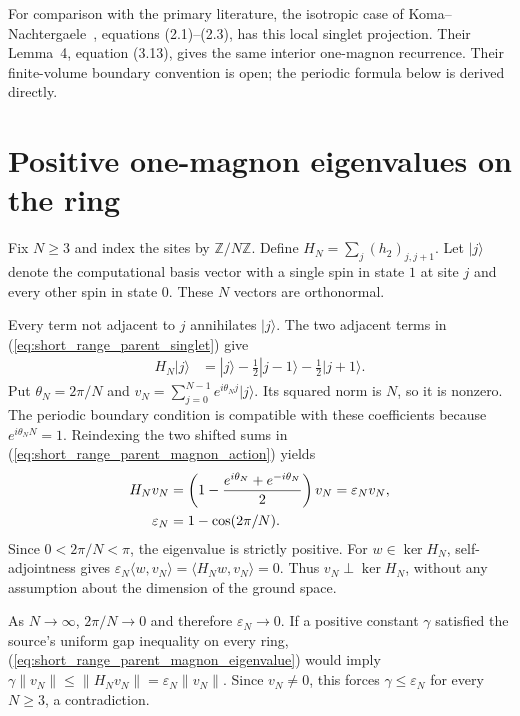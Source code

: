 \documentclass{article}
\begin{document}
For comparison with the primary literature, the isotropic case of
Koma--Nachtergaele~\cite{Koma1997Spectral}, equations (2.1)--(2.3), has this local
singlet projection. Their Lemma~4, equation (3.13), gives the same
interior one-magnon recurrence. Their finite-volume boundary convention
is open; the periodic formula below is derived directly.

\section{Positive one-magnon eigenvalues on the ring}

Fix $N\geq3$ and index the sites by $\mathbb Z/N\mathbb Z$. Define
$H_N=\sum_j(h_2)_{j,j+1}$. Let $|j\rangle$ denote the computational
basis vector with a single spin in state $1$ at site $j$ and every other
spin in state $0$. These $N$ vectors are orthonormal.

Every term not adjacent to $j$ annihilates $|j\rangle$. The two adjacent
terms in (\ref{eq:short_range_parent_singlet}) give
\begin{align}
    H_N|j\rangle
       &=|j\rangle-\frac12|j-1\rangle-\frac12|j+1\rangle.
    \label{eq:short_range_parent_magnon_action}
\end{align}
Put $\theta_N=2\pi/N$ and
$v_N=\sum_{j=0}^{N-1}e^{i\theta_Nj}|j\rangle$. Its squared norm is
$N$, so it is nonzero. The periodic boundary condition is compatible with
these coefficients because $e^{i\theta_NN}=1$. Reindexing the two shifted
sums in (\ref{eq:short_range_parent_magnon_action}) yields
\begin{align}
    H_Nv_N
       &=\left(1-\frac{e^{i\theta_N}+e^{-i\theta_N}}2\right)v_N
        =\varepsilon_N v_N,\notag\\
    \varepsilon_N&=1-\cos(2\pi/N).
    \label{eq:short_range_parent_magnon_eigenvalue}
\end{align}
Since $0<2\pi/N<\pi$, the eigenvalue is strictly positive. For
$w\in\ker H_N$, self-adjointness gives
$\varepsilon_N\langle w,v_N\rangle=\langle H_Nw,v_N\rangle=0$.
Thus $v_N\perp\ker H_N$, without any assumption about the dimension
of the ground space.

As $N\to\infty$, $2\pi/N\to0$ and therefore $\varepsilon_N\to0$.
If a positive constant $\gamma$ satisfied the source's uniform gap
inequality on every ring, (\ref{eq:short_range_parent_magnon_eigenvalue})
would imply
$\gamma\|v_N\|\leq\|H_Nv_N\|=\varepsilon_N\|v_N\|$.
Since $v_N\neq0$, this forces $\gamma\leq\varepsilon_N$ for every
$N\geq3$, a contradiction.
\end{document}
